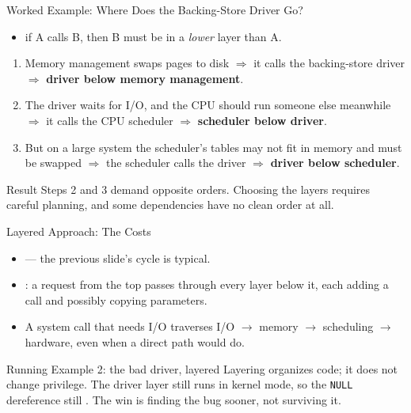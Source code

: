 \documentclass[aspectratio=169]{beamer}
\begin{document}
\begin{frame}{Worked Example: Where Does the Backing-Store Driver Go?}
  \begin{itemize}
    \item {} if A calls B, then B must be in a \emph{lower} layer than
      A.
  \end{itemize}
  \vspace{0.1cm}
  \begin{enumerate}
    \item Memory management swaps pages to disk $\Rightarrow$ it calls the
      backing-store driver $\Rightarrow$ \textbf{driver below memory
      management}.
    \item The driver waits for I/O, and the CPU should run someone else
      meanwhile $\Rightarrow$ it calls the CPU scheduler $\Rightarrow$
      \textbf{scheduler below driver}.
    \item But on a large system the scheduler's tables may not fit in memory
      and must be swapped $\Rightarrow$ the scheduler calls the driver
      $\Rightarrow$ \textbf{driver below scheduler}.
  \end{enumerate}
  \vspace{0.1cm}
  \begin{alertblock}{Result}
    Steps 2 and 3 demand opposite orders. Choosing the layers requires careful
    planning, and some dependencies have no clean order at all.
  \end{alertblock}
\end{frame}

\begin{frame}{Layered Approach: The Costs}
  \begin{itemize}
    \item {} --- the previous slide's cycle is
      typical.
    \item {}: a request from the top passes through
      every layer below it, each adding a call and possibly copying
      parameters.
    \item A system call that needs I/O traverses I/O $\to$ memory $\to$
      scheduling $\to$ hardware, even when a direct path would do.
  \end{itemize}
  \vspace{0.2cm}
  \begin{exampleblock}{Running Example 2: the bad driver, layered}
    Layering organizes code; it does not change privilege. The driver layer
    still runs in kernel mode, so the \texttt{NULL} dereference still
    . The win is finding the bug sooner, not
    surviving it.
  \end{exampleblock}
\end{frame}
\end{document}
